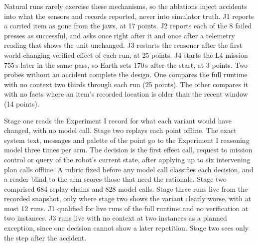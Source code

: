 Natural runs rarely exercise these mechanisms, so the ablations inject accidents into what the sensors and records
reported, never into simulator truth. J1 reports a carried item as gone from the jaws, at 17 points. J2 reports each of
the 8 failed presses as successful, and asks once right after it and once after a telemetry reading that shows the unit
unchanged. J3 restarts the reasoner after the first world-changing verified effect of each run, at 25 points. J4 starts
the L4 mission 755\,s later in the same pass, so Earth sets 170\,s after the start, at 3 points. Two probes without an
accident complete the design. One compares the full runtime with no context two thirds through each run (25 points).
The other compares it with no facts where an item's recorded location is older than the recent window (14 points).

Stage one reads the Experiment I record for what each variant would have changed, with no model call. Stage two replays
each point offline. The exact system text, messages and palette of the point go to the Experiment I reasoning model three
times per arm. The decision is the first effect call, request to mission control or query of the robot's current state,
after applying up to six intervening plan calls offline. A rubric fixed before any model call classifies each decision,
and a reader blind to the arm scores those that need the rationale. Stage two comprised 684 replay chains and 828 model
calls. Stage three runs live from the recorded snapshot, only where stage two shows the variant clearly worse, with at
most 12 runs. J1 qualified for live runs of the full runtime and no verification at two instances. J3 runs live with no
context at two instances as a planned exception, since one decision cannot show a later repetition. Stage two sees only
the step after the accident.

